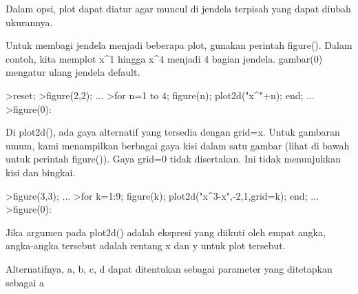 \documentclass[a4paper,10pt]{article}
\begin{document}
\begin{eulernotebook}
\begin{eulercomment}
\begin{eulercomment}
\begin{eulercomment}
\begin{eulercomment}
\begin{eulercomment}
\begin{eulercomment}
\begin{eulercomment}
Dalam opsi, plot dapat diatur agar muncul di jendela terpisah yang
dapat diubah ukurannya.

Untuk membagi jendela menjadi beberapa plot, gunakan perintah
figure(). Dalam contoh, kita memplot x\textasciicircum{}1 hingga x\textasciicircum{}4 menjadi 4 bagian
jendela. gambar(0) mengatur ulang jendela default.
\end{eulercomment}
\begin{eulerprompt}
>reset;
>figure(2,2); ...
>for n=1 to 4; figure(n); plot2d("x^"+n); end; ...
>figure(0):
\end{eulerprompt}
\begin{eulercomment}
Di plot2d(), ada gaya alternatif yang tersedia dengan grid=x. Untuk
gambaran umum, kami menampilkan berbagai gaya kisi dalam satu gambar
(lihat di bawah untuk perintah figure()). Gaya grid=0 tidak
disertakan. Ini tidak menunjukkan kisi dan bingkai.
\end{eulercomment}
\begin{eulerprompt}
>figure(3,3); ...
>for k=1:9; figure(k); plot2d("x^3-x",-2,1,grid=k); end; ...
>figure(0):
\end{eulerprompt}
\begin{eulercomment}
Jika argumen pada plot2d() adalah ekspresi yang diikuti oleh empat
angka, angka-angka tersebut adalah rentang x dan y untuk plot
tersebut.

Alternatifnya, a, b, c, d dapat ditentukan sebagai parameter yang
ditetapkan sebagai a


\end{eulercomment}
\end{eulercomment}
\end{eulercomment}
\end{eulercomment}
\end{eulercomment}
\end{eulercomment}
\end{eulercomment}
\end{eulernotebook}
\end{document}
